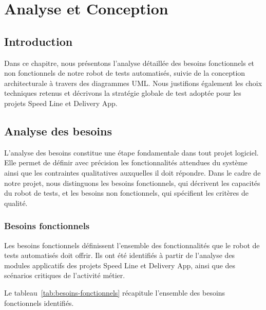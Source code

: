 \chapter{Analyse et Conception}
\label{chap:analyse-conception}

\section*{Introduction}
Dans ce chapitre, nous présentons l'analyse détaillée des besoins fonctionnels et non fonctionnels de notre robot de tests automatisés, suivie de la conception architecturale à travers des diagrammes UML. Nous justifions également les choix techniques retenus et décrivons la stratégie globale de test adoptée pour les projets Speed Line et Delivery App.

\section{Analyse des besoins}
\label{sec:analyse-besoins}

L'analyse des besoins constitue une étape fondamentale dans tout projet logiciel. Elle permet de définir avec précision les fonctionnalités attendues du système ainsi que les contraintes qualitatives auxquelles il doit répondre. Dans le cadre de notre projet, nous distinguons les besoins fonctionnels, qui décrivent les capacités du robot de tests, et les besoins non fonctionnels, qui spécifient les critères de qualité.

\subsection{Besoins fonctionnels}
\label{subsec:besoins-fonctionnels}

Les besoins fonctionnels définissent l'ensemble des fonctionnalités que le robot de tests automatisés doit offrir. Ils ont été identifiés à partir de l'analyse des modules applicatifs des projets Speed Line et Delivery App, ainsi que des scénarios critiques de l'activité métier.

Le tableau~\ref{tab:besoins-fonctionnels} récapitule l'ensemble des besoins fonctionnels identifiés.

